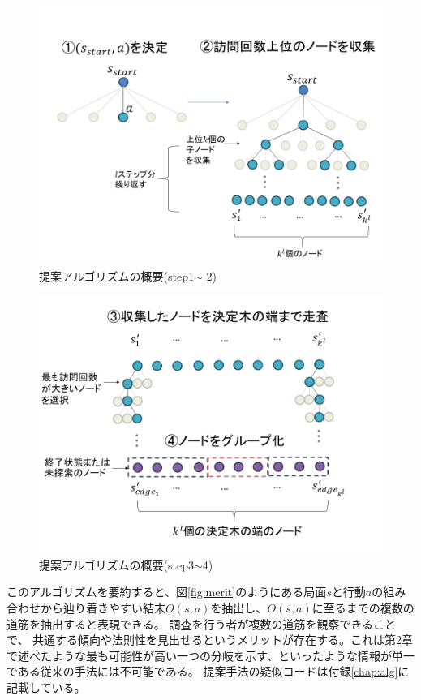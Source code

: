 \begin{figure}[t]
    \centering
    \includegraphics[width=\linewidth]{./figure/1-2.png}
    \caption{提案アルゴリズムの概要(step1$\sim$ 2)}
    \label{fig:step1-2}
\end{figure}
\begin{figure}[t]
    \centering
    \includegraphics[width=\linewidth]{./figure/3-4.png}
    \caption{提案アルゴリズムの概要(step3$\sim $4)}
    \label{fig:step3-4}
\end{figure}

このアルゴリズムを要約すると、図\ref{fig:merit}のようにある局面$s$と行動$a$の組み合わせから辿り着きやすい結末$O(s, a)$を抽出し、$O(s, a)$に至るまでの複数の道筋を抽出すると表現できる。
調査を行う者が複数の道筋を観察できることで、
共通する傾向や法則性を見出せるというメリットが存在する。これは第2章で述べたような最も可能性が高い一つの分岐を示す、といったような情報が単一である従来の手法には不可能である。
提案手法の疑似コードは付録\ref{chap:alg}に記載している。

